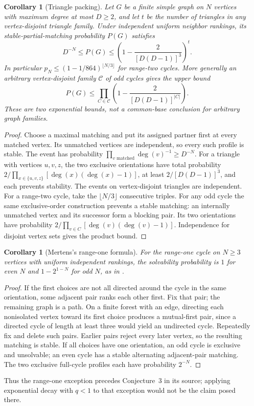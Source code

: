 \documentclass[11pt]{article}
\newtheorem{corollary}[theorem]{Corollary}
\begin{document}
\begin{corollary}[Triangle packing]\label{cor:packing}
Let $G$ be a finite simple graph on $N$ vertices with maximum degree at
most $D\geq2$, and let $t$ be the number of triangles in any
vertex-disjoint triangle family. Under independent uniform neighbor
rankings, its stable-partial-matching probability $P(G)$ satisfies
\[
 D^{-N}\leq P(G)\leq
 \left(1-\frac{2}{[D(D-1)]^3}\right)^t.
\]
In particular $p_N\leq(1-1/864)^{\lfloor N/3\rfloor}$ for range-two
cycles. More generally an arbitrary vertex-disjoint family $\mathcal C$
of odd cycles gives the upper bound
\[
 P(G)\leq\prod_{C\in\mathcal C}
 \left(1-\frac{2}{[D(D-1)]^{|C|}}\right).
\]
These are two exponential bounds, not a common-base conclusion
for arbitrary graph families.
\end{corollary}
\begin{proof}
Choose a maximal matching and put its assigned partner first at every
matched vertex. Its unmatched vertices are independent, so every such
profile is stable. The event has probability
$\prod_{v\text{ matched}}\deg(v)^{-1}\geq D^{-N}$.
For a triangle with vertices $u,v,z$, the two exclusive orientations
have total probability
$2/\prod_{x\in\{u,v,z\}}[\deg(x)(\deg(x)-1)]$,
at least $2/[D(D-1)]^3$, and each prevents stability.
The events on vertex-disjoint triangles are independent.
For a range-two cycle, take the $\lfloor N/3\rfloor$ consecutive triples.
For any odd cycle the same exclusive-order construction prevents a
stable matching: an internally unmatched vertex and its successor form
a blocking pair. Its two orientations have probability
$2/\prod_{v\in C}[\deg(v)(\deg(v)-1)]$. Independence for disjoint
vertex sets gives the product bound.
\end{proof}

\begin{corollary}[Mertens's range-one formula]\label{cor:rangeone}
For the range-one cycle on $N\geq3$ vertices with uniform independent
rankings, the solvability probability is $1$ for even $N$ and
$1-2^{1-N}$ for odd $N$, as in \cite[equation~(13)]{mertens2005}.
\end{corollary}
\begin{proof}
If the first choices are not all directed around the cycle in the same
orientation, some adjacent pair ranks each other first. Fix that pair;
the remaining graph is a path. On a finite forest with an edge, directing
each nonisolated vertex toward its first choice produces a mutual-first
pair, since a directed cycle of length at least three would yield an
undirected cycle. Repeatedly fix and delete such pairs. Earlier pairs
reject every later vertex, so the resulting matching is stable.
If all choices have one orientation, an odd cycle is exclusive and
unsolvable; an even cycle has a stable alternating adjacent-pair matching.
The two exclusive full-cycle profiles each have probability $2^{-N}$.
\end{proof}
Thus the range-one exception precedes Conjecture~3 in its source;
applying exponential decay with $q<1$ to that exception would not be the
claim posed there.
\end{document}
